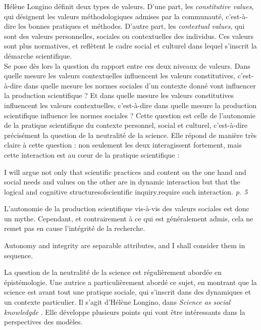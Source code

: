 Hélène Longino définit deux types de valeurs. D'une part, les \emph{constitutive values}, qui désignent les valeurs méthodologiques admises par la communauté, c'est-à-dire les bonnes pratiques et méthodes. D'autre part, les \emph{contextual values}, qui sont des valeurs personnelles, sociales ou contextuelles des individus. Ces valeurs sont plus normatives, et reflètent le cadre social et culturel dans lequel s'inscrit la démarche scientifique. \\

Se pose dès lors la question du rapport entre ces deux niveaux de valeurs. Dans quelle mesure les valeurs contextuelles influencent les valeurs constitutives, c'est-à-dire dans quelle mesure les normes sociales d'un contexte donné vont influencer la production scientifique ? Et dans quelle mesure les valeurs constitutives influencent les valeurs contextuelles, c'est-à-dire dans quelle mesure la production scientifique influence les normes sociales ? Cette question est celle de l'autonomie de la pratique scientifique du contexte personnel, social et culturel, c'est-à-dire précisément la question de la neutralité de la science. Elle répond de manière très claire à cette question : non seulement les deux interagissent fortement, mais cette interaction est au cœur de la pratique scientifique : 

\begin{authoredquote}
    I will argue not only that scientific practices and content on the one hand and social needs and values on the other are in dynamic interaction but that the logical and cognitive structuresofscientific inquiry.require such interaction. \textit{p. 5}
\end{authoredquote}

L'autonomie de la production scientifique vis-à-vis des valeurs sociales est donc un mythe. Cependant, et contrairement à ce qui est généralement admis, cela ne remet pas en cause l'intégrité de la recherche. 

\begin{authoredquote}
    Autonomy and integrity are separable attributes, and I shall consider them in sequence.
\end{authoredquote}

La question de la neutralité de la science est régulièrement abordée en épistémologie. Une autrice a particulièrement abordé ce sujet, en montrant que la science est avant tout une pratique sociale, qui s'inscrit dans des dynamiques et un contexte particulier. Il s'agit d'Hélène Longino, dans \emph{Science as social knowledgde} \autocite{longino_science_1990}. Elle développe plusieurs points qui vont être intéressants dans la perspectives des modèles. \\

